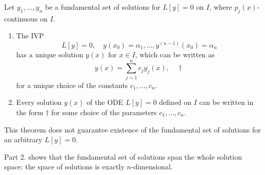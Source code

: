 \begin{theorem}
    Let $y_1, \dots, y_n$ be a fundamental set of solutions for $L[y] = 0$ on $I$, where $p_j(x)$-continuous on $I$.
    \begin{enumerate}
        \item The IVP $$L[y] = 0, \quad y(x_0) = \alpha_1, \dots, y^{(n-1)}(x_0) = \alpha_n$$ has a unique solution $y(x)$ for $x \in I$, which can be written as \[
        y(x) = \sum_{j=1}^{n}c_j y_j(x), \quad \dagger    
        \]
        for a unique choice of the constants $c_1, \dots, c_n$.
        \item Every solution $y(x)$ of the ODE $L[y] = 0$ defined on $I$ can be written in the form $\dagger$ for some choice of the parameters $c_1, \dots, c_n$.
    \end{enumerate}
\end{theorem}

\begin{remark}
    This theorem does not guarantee existence of the fundamental set of solutions for an arbitrary $L[y] = 0$.

    Part 2. shows that the fundamental set of solutions span the whole solution space: the space of solutions is exactly $n$-dimensional.
\end{remark}

